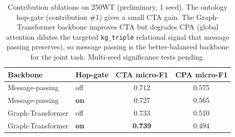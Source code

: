 \begin{table}[t]
\centering
\caption{Contribution ablations on 250WT (preliminary, 1 seed). The ontology
hop-gate (contribution \#1) gives a small CTA gain. The Graph-Transformer backbone
improves CTA but degrades CPA (global attention dilutes the targeted \texttt{kg\_triple}
relational signal that message passing preserves), so message passing is the
better-balanced backbone for the joint task. Multi-seed significance tests pending.}
\label{tab:ablation}
\begin{tabular}{llcc}
\toprule
Backbone & Hop-gate & CTA micro-F1 & CPA micro-F1 \\
\midrule
Message-passing & off & 0.712 & 0.575 \\
Message-passing & \textbf{on}  & 0.727 & 0.565 \\
Graph-Transformer & off & 0.733 & 0.510 \\
Graph-Transformer & \textbf{on}  & \textbf{0.739} & 0.494 \\
\bottomrule
\end{tabular}
\end{table}
